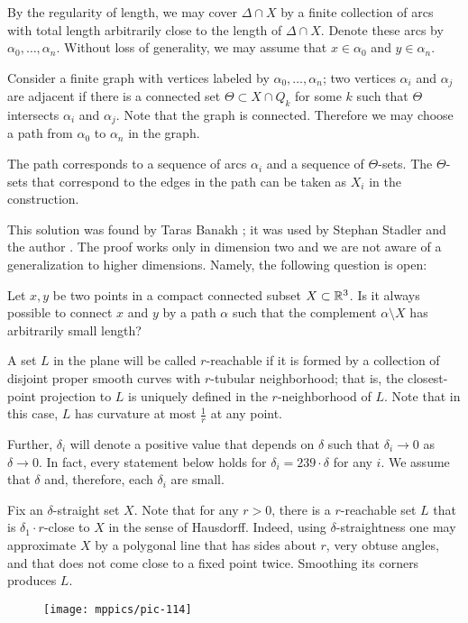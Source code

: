 By the regularity of length, we may cover $\Delta\cap X$ by a finite collection of arcs with total length arbitrarily close to the length of $\Delta\cap X$.
Denote these arcs by $\alpha_0,\dots,\alpha_n$.
Without loss of generality, we may assume that $x\in\alpha_0$ and $y\in\alpha_n$.

Consider a finite graph with vertices labeled by $\alpha_0,\dots,\alpha_n$;
two vertices $\alpha_i$ and $\alpha_j$ are adjacent if there is a connected set $\Theta\subset  X\cap Q_k$ 
for some $k$ such that $\Theta$ intersects $\alpha_i$ and $\alpha_j$.
Note that the graph is connected. Therefore we may choose a path from $\alpha_0$ to $\alpha_n$ in the graph.

The path corresponds to a sequence of arcs $\alpha_i$ and a sequence of $\Theta$-sets.
The $\Theta$-sets that correspond to the edges in the path can be taken as $ X_i$ in the construction.
\qeds

This solution was found by Taras Banakh \cite{banakh};
it was used by Stephan Stadler and the author \cite{petrunin-stadler:revisited}.
The proof works only in dimension two and we are not aware of a generalization to higher dimensions. 
Namely, the following question is open:

\begin{pr}
Let $x,y$ be two points in a compact connected subset $X\subset \mathbb{R}^3$. 
Is it always possible to connect $x$ and $y$ by a path $\alpha$ such that the complement $\alpha\setminus X$ has arbitrarily small length?
\end{pr}


A set $L$ in the plane will be called $r$-reachable
if it is formed by a collection of disjoint proper smooth curves 
with $r$-tubular neighborhood;
that is, the closest-point projection to $L$ is uniquely defined in the $r$-neighborhood of $L$.
Note that in this case, $L$ has curvature at most $\tfrac1r$ at any point.

Further, $\delta_i$ will denote a positive value that depends on $\delta$ such that $\delta_i\to0$ as $\delta\to 0$.
In fact, every statement below holds for $\delta_i=239\cdot\delta$ for any $i$.
We assume that $\delta$ and, therefore, each $\delta_i$ are small.

Fix an $\delta$-straight set $X$.
Note that for any $r>0$, there is a $r$-reachable set $L$ 
that is $\delta_1\cdot r$-close to $X$ in the sense of Hausdorff.
Indeed, using $\delta$-straightness one may approximate $X$ by a polygonal line that has sides about $r$, very obtuse angles, and that does not come close to a fixed point twice.
Smoothing its corners produces $L$.
\begin{figure}[ht!]
\centering
\texttt{[image: mppics/pic-114]}
\end{figure}

